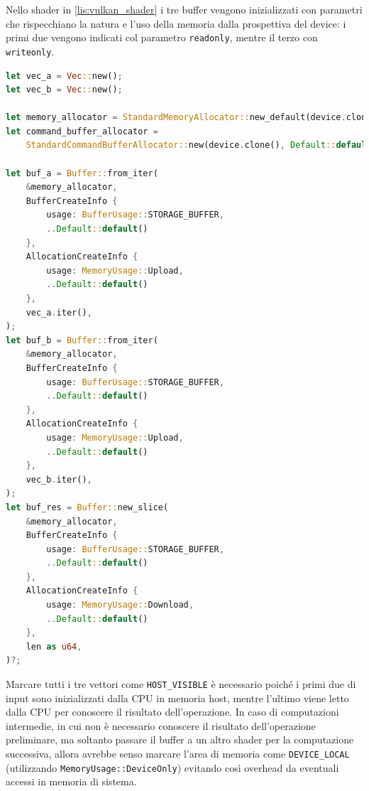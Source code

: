 Nello shader in \ref{lis:vulkan_shader} i tre buffer vengono inizializzati con parametri che rispecchiano la natura e l'uso della memoria dalla prospettiva del device: i primi due vengono indicati col parametro \verb|readonly|, mentre il terzo con \verb|writeonly|. 

\vspace{5mm}
\begin{lstlisting}[language=Rust, caption=Inizializzazione buffer Vulkan, label=lis:vulkan_buffer]
let vec_a = Vec::new();
let vec_b = Vec::new();

let memory_allocator = StandardMemoryAllocator::new_default(device.clone());
let command_buffer_allocator =
    StandardCommandBufferAllocator::new(device.clone(), Default::default());

let buf_a = Buffer::from_iter(
    &memory_allocator,
    BufferCreateInfo {
        usage: BufferUsage::STORAGE_BUFFER,
        ..Default::default()
    },
    AllocationCreateInfo {
        usage: MemoryUsage::Upload,
        ..Default::default()
    },
    vec_a.iter(),
);
let buf_b = Buffer::from_iter(
    &memory_allocator,
    BufferCreateInfo {
        usage: BufferUsage::STORAGE_BUFFER,
        ..Default::default()
    },
    AllocationCreateInfo {
        usage: MemoryUsage::Upload,
        ..Default::default()
    },
    vec_b.iter(),
);
let buf_res = Buffer::new_slice(
    &memory_allocator,
    BufferCreateInfo {
        usage: BufferUsage::STORAGE_BUFFER,
        ..Default::default()
    },
    AllocationCreateInfo {
        usage: MemoryUsage::Download,
        ..Default::default()
    },
    len as u64,
)?;
\end{lstlisting}
\vspace{5mm}

Marcare tutti i tre vettori come \verb|HOST_VISIBLE| è necessario poiché i primi due di input sono inizializzati dalla CPU in memoria host, mentre l'ultimo viene letto dalla CPU per conoscere il risultato dell'operazione. In caso di computazioni intermedie, in cui non è necessario conoscere il risultato dell'operazione preliminare, ma soltanto passare il buffer a un altro shader per la computazione successiva, allora avrebbe senso marcare l'area di memoria come \verb|DEVICE_LOCAL| (utilizzando \verb|MemoryUsage::DeviceOnly|) evitando così overhead da eventuali accessi in memoria di sistema.

